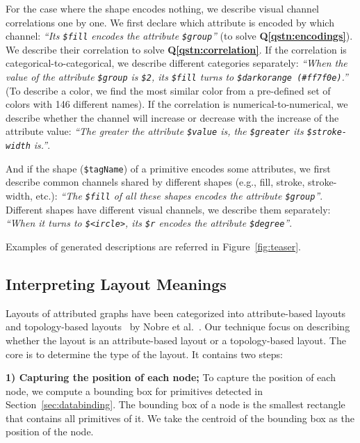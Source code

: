 For the case where the shape encodes nothing, we describe visual channel correlations one by one.
We first declare which attribute is encoded by which channel: \textit{``Its \texttt{\$fill} encodes the attribute \texttt{\$group}''} (to solve \textbf{Q\ref{qstn:encodings}}).
We describe their correlation to solve \textbf{Q\ref{qstn:correlation}}.
If the correlation is categorical-to-categorical, we describe different categories separately: \textit{``When the value of the attribute \texttt{\$group} is \texttt{\$2}, its \texttt{\$fill} turns to \texttt{\$darkorange (\#ff7f0e)}.''} (To describe a color, we find the most similar color from a pre-defined set of colors with 146 different names).
If the correlation is numerical-to-numerical, we describe whether the channel will increase or decrease with the increase of the attribute value: \textit{``The greater the attribute \texttt{\$value} is, the \texttt{\$greater} its \texttt{\$stroke-width} is.''}.

And if the shape (\texttt{\$tagName}) of a primitive encodes some attributes, we first describe common channels shared by different shapes (e.g., fill, stroke, stroke-width, etc.): \textit{``The \texttt{\$fill} of all these shapes encodes the attribute \texttt{\$group}''}.
Different shapes have different visual channels, we describe them separately: \textit{``When it turns to \texttt{\$<ircle>}, its \texttt{\$r} encodes the attribute \texttt{\$degree}''}.

Examples of generated descriptions are referred in Figure~\ref{fig:teaser}.

\subsection{Interpreting Layout Meanings}
Layouts of attributed graphs have been categorized into attribute-based layouts~\cite{} and topology-based layouts~\cite{} by Nobre et al.~\cite{DBLP:journals/cgf/NobreMSL19}.
Our technique focus on describing whether the layout is an attribute-based layout or a topology-based layout.
The core is to determine the type of the layout.
It contains two steps: 

\textbf{1) Capturing the position of each node;} To capture the position of each node, we compute a bounding box for primitives detected in Section~\ref{sec:databinding}.
The bounding box of a node is the smallest rectangle that contains all primitives of it.
We take the centroid of the bounding box as the position of the node.

